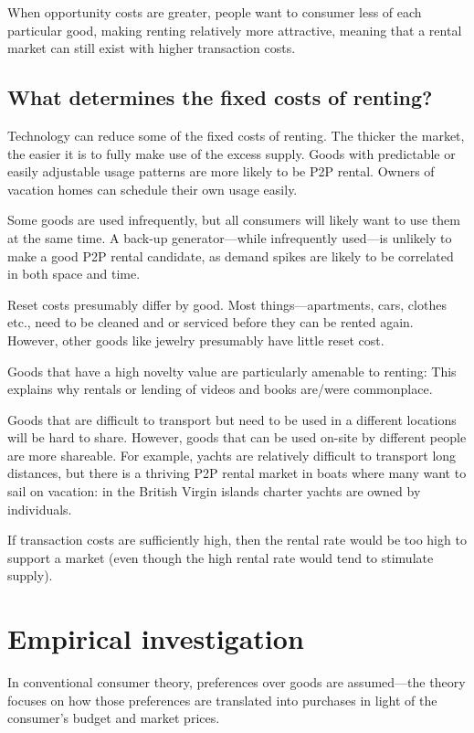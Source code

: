 \documentclass[11pt]{article}
\begin{document}
When opportunity costs are greater, people want to consumer less of each particular good, making renting relatively more attractive, meaning that a rental market can still exist with higher transaction costs. 

\subsection{What determines the fixed costs of renting?} 
Technology can reduce some of the fixed costs of renting. 
The thicker the market, the easier it is to fully make use of the excess supply. 
Goods with predictable or easily adjustable usage patterns are more likely to be P2P rental. 
Owners of vacation homes can schedule their own usage easily. 

Some goods are used infrequently, but all consumers will likely want to use them at the same time. 
A back-up generator---while infrequently used---is unlikely to make a
good P2P rental candidate, as demand spikes are likely to be correlated in both space and time. 

Reset costs presumably differ by good. 
Most things---apartments, cars, clothes etc., need to be cleaned and or serviced before they can be rented again. 
However, other goods like jewelry presumably have little reset cost.

Goods that have a high novelty value are particularly amenable to renting: 
This explains why rentals or lending of videos and books are/were commonplace.  

Goods that are difficult to transport but need to be used in a different locations will be hard to share. 
However, goods that can be used on-site by different people are more shareable. 
For example, yachts are relatively difficult to transport long distances, but there is a thriving P2P rental market in boats where many want to sail on vacation: 
in the British Virgin islands charter yachts are owned by individuals. 

If transaction costs are sufficiently high, then the rental rate would be too high to support a market (even though the high rental rate would tend to stimulate supply). 

\section{Empirical investigation} 
In conventional consumer theory, preferences over goods are assumed---the theory focuses on how those preferences are translated into purchases in light of the consumer's budget and market prices. 
\end{document}
